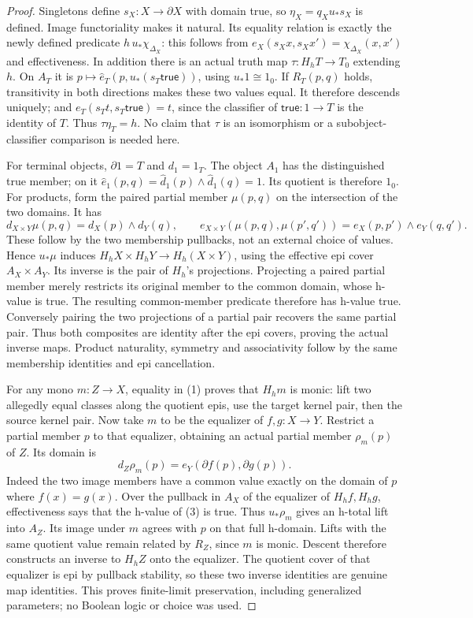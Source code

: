 \begin{proof}
Singletons define \(s_X:X\to\partial X\) with domain true,
so \(\eta_X=q_Xu_*s_X\) is defined. Image functoriality makes
it natural. Its equality relation is exactly the newly defined
predicate \(h\,u_*\chi_{\Delta_X}\): this follows from
\(e_X(s_Xx,s_Xx')=\chi_{\Delta_X}(x,x')\) and effectiveness.
In addition there is an actual truth map \(\tau:H_hT\to T_0\)
extending \(h\). On \(A_T\) it is
\(p\mapsto\widehat e_T(p,u_*(s_T\mathsf{true}))\),
using \(u_*1\cong1_0\).
If \(R_T(p,q)\) holds, transitivity in both directions makes
these two values equal. It therefore descends uniquely; and
\(e_T(s_Tt,s_T\mathsf{true})=t\), since the classifier of
\(\mathsf{true}:1\to T\) is the identity of \(T\).
Thus \(\tau\eta_T=h\). No claim that \(\tau\) is an
isomorphism or a subobject-classifier comparison is needed here.

For terminal objects, \(\partial1=T\) and \(d_1=1_T\).
The object \(A_1\) has the distinguished true member; on it
\(\widehat e_1(p,q)=\widehat d_1(p)\wedge\widehat d_1(q)=1\).
Its quotient is therefore \(1_0\). For products, form the paired
partial member \(\mu(p,q)\) on the intersection of the two
domains. It has
\[
 d_{X\times Y}\mu(p,q)=d_X(p)\wedge d_Y(q),\qquad
 e_{X\times Y}(\mu(p,q),\mu(p',q'))
                         =e_X(p,p')\wedge e_Y(q,q').       \tag{2}
\]
These follow by the two membership pullbacks, not an external choice
of values. Hence \(u_*\mu\) induces
\(H_hX\times H_hY\to H_h(X\times Y)\), using the effective
epi cover \(A_X\times A_Y\). Its inverse is the pair of
\(H_h\)'s projections. Projecting a paired partial member merely
restricts its original member to the common domain, whose h-value
is true. The resulting common-member predicate therefore has h-value
true. Conversely pairing the two projections of a partial pair
recovers the same partial pair. Thus both composites are identity
after the epi covers, proving the actual inverse maps. Product
naturality, symmetry and associativity follow by the same membership
identities and epi cancellation.

For any mono \(m:Z\to X\), equality in (1) proves that
\(H_hm\) is monic: lift two allegedly equal classes along the
quotient epis, use the target kernel pair, then the source kernel
pair. Now take \(m\) to be the equalizer of \(f,g:X\to Y\).
Restrict a partial member \(p\) to that equalizer, obtaining an
actual partial member \(\rho_m(p)\) of \(Z\). Its domain is
\[
             d_Z\rho_m(p)=e_Y(\partial f(p),\partial g(p)).
                                                               \tag{3}
\]
Indeed the two image members have a common value exactly on the
domain of \(p\) where \(f(x)=g(x)\). Over the pullback in
\(A_X\) of the equalizer of \(H_hf,H_hg\), effectiveness says
that the h-value of (3) is true. Thus \(u_*\rho_m\) gives an
h-total lift into \(A_Z\). Its image under \(m\) agrees with
\(p\) on that full h-domain. Lifts with the same quotient value
remain related by \(R_Z\), since \(m\) is monic. Descent
therefore constructs an inverse to \(H_hZ\) onto the equalizer.
The quotient cover of that equalizer is epi by pullback stability,
so these two inverse identities are genuine map identities. This
proves finite-limit preservation, including generalized parameters;
no Boolean logic or choice was used.


\end{proof}
